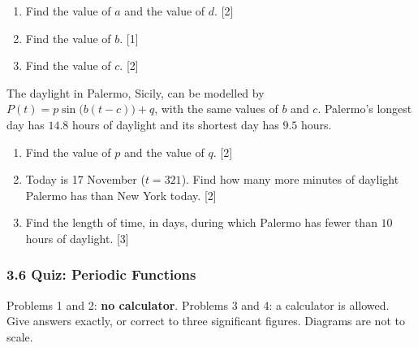 \documentclass[12pt, twoside]{article}
\begin{document}
\begin{enumerate}[itemsep=0.15cm]
\begin{enumerate}[itemsep=0.05cm]
  \item Find the value of $a$ and the value of $d$. \hfill [2]
  \item Find the value of $b$. \hfill [1]
  \item Find the value of $c$. \hfill [2]
\end{enumerate}

The daylight in Palermo, Sicily, can be modelled by
$P(t) = p\sin\bigl(b(t - c)\bigr) + q$, with the same values of $b$ and
$c$. Palermo's longest day has $14.8$ hours of daylight and its shortest
day has $9.5$ hours.

\begin{enumerate}[itemsep=0.05cm]
  \item[(d)] Find the value of $p$ and the value of $q$. \hfill [2]
  \item[(e)] Today is 17 November ($t = 321$). Find how many more minutes
  of daylight Palermo has than New York today. \hfill [2]
  \item[(f)] Find the length of time, in days, during which Palermo has
  fewer than $10$ hours of daylight. \hfill [3]
\end{enumerate}


\end{enumerate}

\newpage

\subsubsection*{3.6 Quiz: Periodic Functions}

Problems 1 and 2: \textbf{no calculator}. Problems 3 and 4: a calculator is
allowed. Give answers exactly, or correct to three significant figures.
Diagrams are not to scale.
\end{document}
